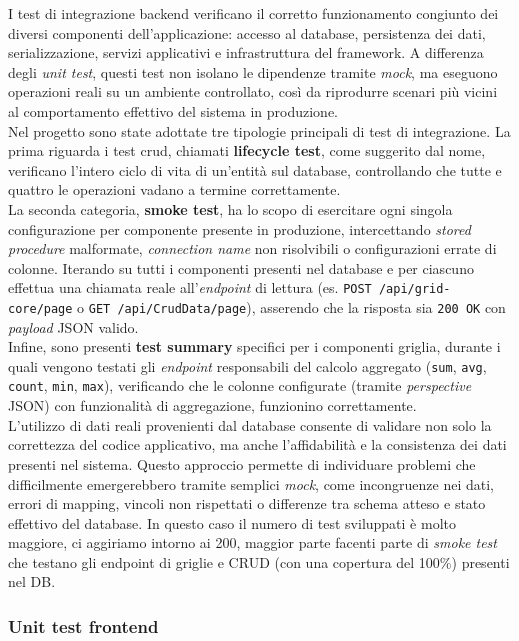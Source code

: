 I test di integrazione backend verificano il corretto funzionamento congiunto
dei diversi componenti dell’applicazione: accesso al database, persistenza dei dati,
serializzazione, servizi applicativi e infrastruttura del framework.
A differenza degli \emph{unit test}, questi test non isolano le dipendenze tramite
\emph{mock}, ma eseguono operazioni reali su un ambiente controllato, così da
riprodurre scenari più vicini al comportamento effettivo del sistema in produzione.\\
Nel progetto sono state adottate tre tipologie principali di test di integrazione.
La prima riguarda i test \gls{crud},
chiamati \textbf{lifecycle test}, come suggerito dal nome, verificano l'intero ciclo di vita
di un'entità sul database, controllando che tutte e quattro le operazioni vadano a termine correttamente.\\
La seconda categoria, \textbf{smoke test}, ha lo scopo di esercitare ogni singola configurazione
per componente presente in produzione,
intercettando \emph{stored procedure} malformate, \emph{connection name} non
risolvibili o configurazioni errate di colonne. Iterando su tutti i componenti
presenti nel database e per ciascuno
effettua una chiamata reale all'\emph{endpoint} di lettura
(es. \texttt{POST /api/grid-core/page} o \texttt{GET /api/CrudData/page}),
asserendo che la risposta sia \texttt{200 OK} con \emph{payload} JSON valido. \\
Infine, sono presenti \textbf{test summary} specifici per i componenti griglia, durante i quali
vengono testati gli \emph{endpoint} responsabili del calcolo aggregato (\texttt{sum},
\texttt{avg}, \texttt{count}, \texttt{min}, \texttt{max}), verificando che le
colonne configurate (tramite \emph{perspective} JSON) con funzionalità di aggregazione, funzionino correttamente.\\
L’utilizzo di dati reali provenienti dal database consente di validare non solo
la correttezza del codice applicativo, ma anche l’affidabilità e la consistenza
dei dati presenti nel sistema. Questo approccio permette di individuare problemi
che difficilmente emergerebbero tramite semplici \emph{mock}, come incongruenze
nei dati, errori di mapping, vincoli non rispettati o differenze tra schema
atteso e stato effettivo del database.
In questo caso il numero di test sviluppati è molto maggiore, ci aggiriamo intorno ai 200,
maggior parte facenti parte di \emph{smoke test} che testano gli endpoint di griglie e CRUD (con una copertura del 100\%)
presenti nel DB.

\subsubsection{Unit test frontend}

